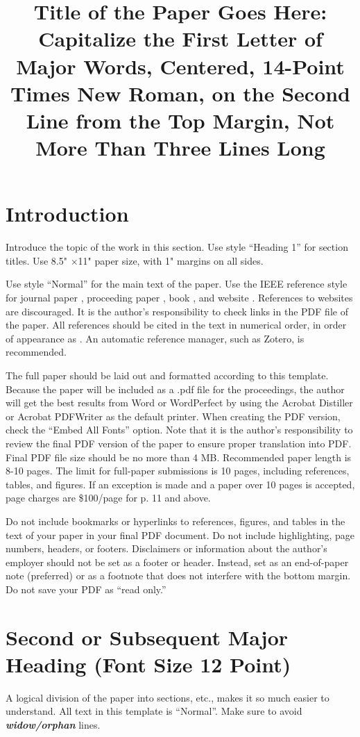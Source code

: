 \documentclass[letterpaper]{mc2025}
\title{Title of the Paper Goes Here: Capitalize the First Letter of Major Words, Centered, 14-Point Times New Roman, on the Second Line from the Top Margin, Not More Than Three Lines Long}
\begin{document}
\section{Introduction}\label{sec:1}
Introduce the topic of the work in this section.
Use style ``Heading 1'' for section titles. Use 8.5" ×11" paper size, with 1" margins on all sides.

Use style ``Normal'' for the main text of the paper.
Use the IEEE reference style for journal paper \cite{journal}, proceeding paper \cite{conf_paper}, book \cite{book}, and website \cite{website}.
References to websites are discouraged. It is the author’s responsibility to check links in the PDF file of the paper.
All references should be cited in the text in numerical order, in order of appearance as \cite{book,website,proc_paper}. An automatic reference manager, such as Zotero, is recommended.

The full paper should be laid out and formatted according to this template.
Because the paper will be included as a .pdf file for the proceedings, the author will get the best results from Word or WordPerfect by using the Acrobat Distiller or Acrobat PDFWriter as the default printer.
When creating the PDF version, check the ``Embed All Fonts'' option.
Note that it is the author's responsibility to review the final PDF version of the paper to ensure proper translation into PDF.
Final PDF file size should be no more than 4 MB.
Recommended paper length is 8-10 pages.
The limit for full-paper submissions is 10 pages, including references, tables, and figures.
If an exception is made and a paper over 10 pages is accepted, page charges are \$100/page for p. 11 and above.

Do not include bookmarks or hyperlinks to references, figures, and tables in the text of your paper in your final PDF document.
Do not include highlighting, page numbers, headers, or footers.
Disclaimers or information about the author’s employer should not be set as a footer or header.
Instead, set as an end-of-paper note (preferred) or as a footnote that does not interfere with the bottom margin. Do not save your PDF as ``read only.''


\section{Second or Subsequent Major Heading (Font Size 12 Point)} \label{sec:2}

A logical division of the paper into sections, etc., makes it so much easier to understand. All text in this template is ``Normal''.
Make sure to avoid \textbf{\textit{widow/orphan}}  lines.
\end{document}
